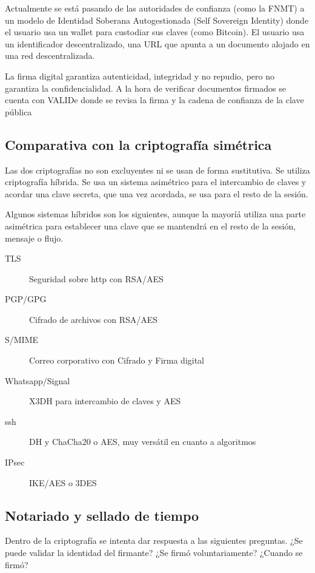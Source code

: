         Actualmente se está pasando de las autoridades de confianza (como la FNMT) a un modelo de Identidad Soberana Autogestionada (Self Sovereign Identity) donde el usuario usa un wallet para custodiar sus claves (como Bitcoin). El usuario usa un identificador descentralizado, una URL que apunta a un documento alojado en una red descentralizada.

        La firma digital garantiza autenticidad, integridad y no repudio, pero no garantiza la confidencialidad. A la hora de verificar documentos firmados se cuenta con VALIDe donde se revisa la firma y la cadena de confianza de la clave pública

    \subsection{Comparativa con la criptografía simétrica}
        Las dos criptografías no son excluyentes ni se usan de forma sustitutiva. Se utiliza criptografía híbrida. Se usa un sistema asimétrico para el intercambio de claves y acordar una clave secreta, que una vez acordada, se usa para el resto de la sesión.

        Algunos sistemas híbridos son los siguientes, aunque la mayoríá utiliza una parte asimétrica para establecer una clave que se mantendrá en el resto de la sesión, mensaje o flujo.
        \begin{description}
            \item[TLS] Seguridad sobre http con RSA/AES
            \item[PGP/GPG] Cifrado de archivos con RSA/AES
            \item[S/MIME] Correo corporativo con Cifrado y Firma digital
            \item[Whatsapp/Signal] X3DH para intercambio de claves y AES
            \item[ssh] DH y ChaCha20 o AES, muy versátil en cuanto a algoritmos
            \item[IPsec] IKE/AES o 3DES
        \end{description}

\subsection{Notariado y sellado de tiempo} %
    Dentro de la criptografía se intenta dar respuesta a las siguientes preguntas. ¿Se puede validar la identidad del firmante? ¿Se firmó voluntariamente? ¿Cuando se firmó?

